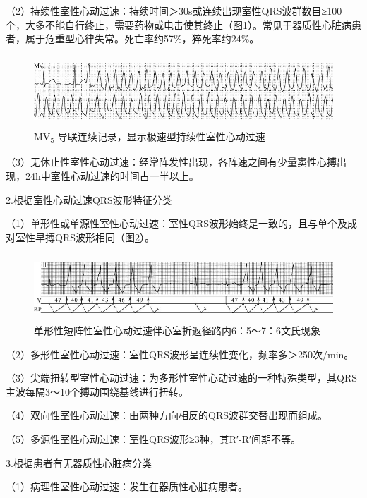 （2）持续性室性心动过速：持续时间＞30s或连续出现室性QRS波群数目≥100个，大多不能自行终止，需要药物或电击使其终止（图\ref{fig33-2}）。常见于器质性心脏病患者，属于危重型心律失常。死亡率约57\%，猝死率约24\%。

\begin{figure}[!htbp]
 \centering
 \includegraphics[width=5.58333in,height=1.05208in]{./images/Image00531.jpg}
 \captionsetup{justification=centering}
 \caption{MV\textsubscript{5} 导联连续记录，显示极速型持续性室性心动过速}
 \label{fig33-2}
  \end{figure} 

（3）无休止性室性心动过速：经常阵发性出现，各阵速之间有少量窦性心搏出现，24h中室性心动过速的时间占一半以上。

2.根据室性心动过速QRS波形特征分类

（1）单形性或单源性室性心动过速：室性QRS波形始终是一致的，且与单个及成对室性早搏QRS波形相同（图\ref{fig33-3}）。

\begin{figure}[!htbp]
 \centering
 \includegraphics[width=5.71875in,height=0.97917in]{./images/Image00532.jpg}
 \captionsetup{justification=centering}
 \caption{单形性短阵性室性心动过速伴心室折返径路内6：5～7：6文氏现象}
 \label{fig33-3}
  \end{figure} 

（2）多形性室性心动过速：室性QRS波形呈连续性变化，频率多＞250次/min。

（3）尖端扭转型室性心动过速：为多形性室性心动过速的一种特殊类型，其QRS主波每隔3～10个搏动围绕基线进行扭转。

（4）双向性室性心动过速：由两种方向相反的QRS波群交替出现而组成。

（5）多源性室性心动过速：室性QRS波形≥3种，其R′-R′间期不等。

3.根据患者有无器质性心脏病分类

（1）病理性室性心动过速：发生在器质性心脏病患者。


